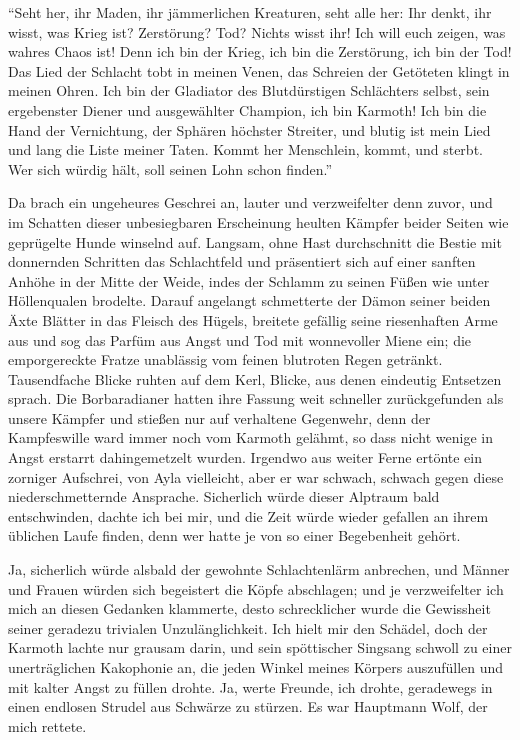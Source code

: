 ``Seht her, ihr Maden, ihr jämmerlichen Kreaturen, seht alle her: Ihr denkt, ihr wisst, was Krieg ist? Zerstörung? Tod? Nichts wisst ihr! Ich will euch zeigen, was wahres Chaos ist! Denn ich bin der Krieg, ich bin die Zerstörung, ich bin der Tod! Das Lied der Schlacht tobt in meinen Venen, das Schreien der Getöteten klingt in meinen Ohren. Ich bin der Gladiator des Blutdürstigen Schlächters selbst, sein ergebenster Diener und ausgewählter Champion, ich bin Karmoth! Ich bin die Hand der Vernichtung, der Sphären höchster Streiter, und blutig ist mein Lied und lang die Liste meiner Taten. Kommt her Menschlein, kommt, und sterbt. Wer sich würdig hält, soll seinen Lohn schon finden.''

Da brach ein ungeheures Geschrei an, lauter und verzweifelter denn zuvor, und im Schatten dieser unbesiegbaren Erscheinung heulten Kämpfer beider Seiten wie geprügelte Hunde winselnd auf. Langsam, ohne Hast durchschnitt die Bestie mit donnernden Schritten das Schlachtfeld und präsentiert sich auf einer sanften Anhöhe in der Mitte der Weide, indes der Schlamm zu seinen Füßen wie unter Höllenqualen brodelte. Darauf angelangt schmetterte der Dämon seiner beiden Äxte Blätter in das Fleisch des Hügels, breitete gefällig seine riesenhaften Arme aus und sog das Parfüm aus Angst und Tod mit wonnevoller Miene ein; die emporgereckte Fratze unablässig vom feinen blutroten Regen getränkt. Tausendfache Blicke ruhten auf dem Kerl, Blicke, aus denen eindeutig Entsetzen sprach. Die Borbaradianer hatten ihre Fassung weit schneller zurückgefunden als unsere Kämpfer und stießen nur auf verhaltene Gegenwehr, denn der Kampfeswille ward immer noch vom Karmoth gelähmt, so dass nicht wenige in Angst erstarrt dahingemetzelt wurden. Irgendwo aus weiter Ferne ertönte ein zorniger Aufschrei, von Ayla vielleicht, aber er war schwach, schwach gegen diese niederschmetternde Ansprache. Sicherlich würde dieser Alptraum bald entschwinden, dachte ich bei mir, und die Zeit würde wieder gefallen an ihrem üblichen Laufe finden, denn wer hatte je von so einer Begebenheit gehört.

Ja, sicherlich würde alsbald der gewohnte Schlachtenlärm anbrechen, und Männer und Frauen würden sich begeistert die Köpfe abschlagen; und je verzweifelter ich mich an diesen Gedanken klammerte, desto schrecklicher wurde die Gewissheit seiner geradezu trivialen Unzulänglichkeit. Ich hielt mir den Schädel, doch der Karmoth lachte nur grausam darin, und sein spöttischer Singsang schwoll zu einer unerträglichen Kakophonie an, die jeden Winkel meines Körpers auszufüllen und mit kalter Angst zu füllen drohte. Ja, werte Freunde, ich drohte, geradewegs in einen endlosen Strudel aus Schwärze zu stürzen. Es war Hauptmann Wolf, der mich rettete.

